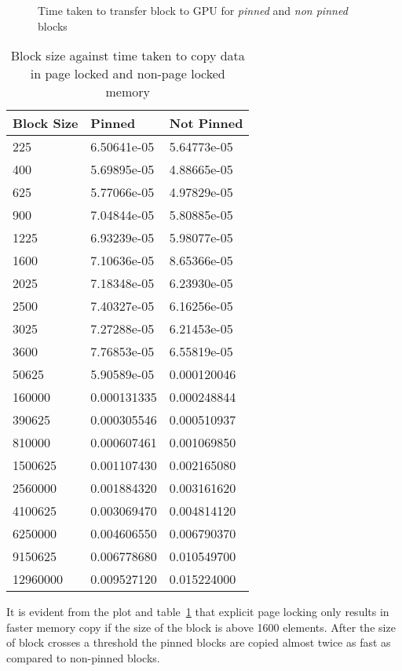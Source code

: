 \begin{figure}[h]
  
  \caption{Time taken to transfer block to GPU for \textit{pinned} and \textit{non pinned} blocks}
  \label{fig:mempin_block_copy}
\end{figure}

\begin{table}[h]
  \centering
  \begin{tabular}{l | l | l}
    \hline
    Block Size & Pinned      & Not Pinned  \\
    \hline
    225        & 6.50641e-05 & 5.64773e-05 \\
    400        & 5.69895e-05 & 4.88665e-05 \\
    625        & 5.77066e-05 & 4.97829e-05 \\
    900        & 7.04844e-05 & 5.80885e-05 \\
    1225       & 6.93239e-05 & 5.98077e-05 \\
    1600       & 7.10636e-05 & 8.65366e-05 \\
    2025       & 7.18348e-05 & 6.23930e-05 \\
    2500       & 7.40327e-05 & 6.16256e-05 \\
    3025       & 7.27288e-05 & 6.21453e-05 \\
    3600       & 7.76853e-05 & 6.55819e-05 \\
    50625      & 5.90589e-05 & 0.000120046 \\
    160000     & 0.000131335 & 0.000248844 \\
    390625     & 0.000305546 & 0.000510937 \\
    810000     & 0.000607461 & 0.001069850 \\
    1500625    & 0.001107430 & 0.002165080 \\
    2560000    & 0.001884320 & 0.003161620 \\
    4100625    & 0.003069470 & 0.004814120 \\
    6250000    & 0.004606550 & 0.006790370 \\
    9150625    & 0.006778680 & 0.010549700 \\
    12960000   & 0.009527120 & 0.015224000 \\
    \hline
  \end{tabular}
  \caption{Block size against time taken to copy data in page locked and non-page locked memory}
  \label{tab:mempin_block_copy}
\end{table}

It is evident from the plot and table~\ref{tab:mempin_block_copy} that explicit
page locking only results in faster memory copy if the size of the block is above
1600 elements. After the size of block crosses a threshold the pinned blocks are
copied almost twice as fast as compared to non-pinned blocks.

